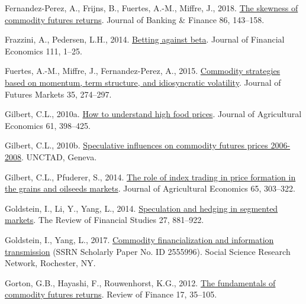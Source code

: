 \documentclass[]{elsarticle} %
\newlength{\cslhangindent}
\newlength{\cslentryspacingunit} %
\newenvironment{CSLReferences}[2] %
 {%
  \setlength{\parindent}{0pt}
  \ifodd #1
  \let\oldpar\par
  \def\par{\hangindent=\cslhangindent\oldpar}
  \fi
  \setlength{\parskip}{#2\cslentryspacingunit}
 }%
 {}
\begin{document}
\begin{CSLReferences}{1}{0}
\leavevmode{}%
Fernandez-Perez, A., Frijns, B., Fuertes, A.-M., Miffre, J., 2018. \href{https://doi.org/10.1016/j.jbankfin.2017.06.015}{The skewness of commodity futures returns}. Journal of Banking \& Finance 86, 143--158.

\leavevmode{}%
Frazzini, A., Pedersen, L.H., 2014. \href{https://doi.org/10.1016/j.jfineco.2013.10.005}{Betting against beta}. Journal of Financial Economics 111, 1--25.

\leavevmode{}%
Fuertes, A.-M., Miffre, J., Fernandez-Perez, A., 2015. \href{https://doi.org/10.1002/fut.21656}{Commodity strategies based on momentum, term structure, and idiosyncratic volatility}. Journal of Futures Markets 35, 274--297.

\leavevmode{}%
Gilbert, C.L., 2010a. \href{https://doi.org/10.1111/j.1477-9552.2010.00248.x}{How to understand high food prices}. Journal of Agricultural Economics 61, 398--425.

\leavevmode{}%
Gilbert, C.L., 2010b. \href{https://www.cftc.gov/sites/default/files/idc/groups/public/@swaps/documents/file/plstudy_14_cifrem.pdf}{Speculative influences on commodity futures prices 2006-2008}. UNCTAD, Geneva.

\leavevmode{}%
Gilbert, C.L., Pfuderer, S., 2014. \href{https://doi.org/10.1111/1477-9552.12068}{The role of index trading in price formation in the grains and oilseeds markets}. Journal of Agricultural Economics 65, 303--322.

\leavevmode{}%
Goldstein, I., Li, Y., Yang, L., 2014. \href{https://doi.org/10.1093/rfs/hht059}{Speculation and hedging in segmented markets}. The Review of Financial Studies 27, 881--922.

\leavevmode{}%
Goldstein, I., Yang, L., 2017. \href{https://doi.org/10.2139/ssrn.2555996}{Commodity financialization and information transmission} (SSRN Scholarly Paper No. ID 2555996). Social Science Research Network, Rochester, NY.

\leavevmode{}%
Gorton, G.B., Hayashi, F., Rouwenhorst, K.G., 2012. \href{https://doi.org/10.1093/rof/rfs019}{The fundamentals of commodity futures returns}. Review of Finance 17, 35--105.


\end{CSLReferences}
\end{document}
